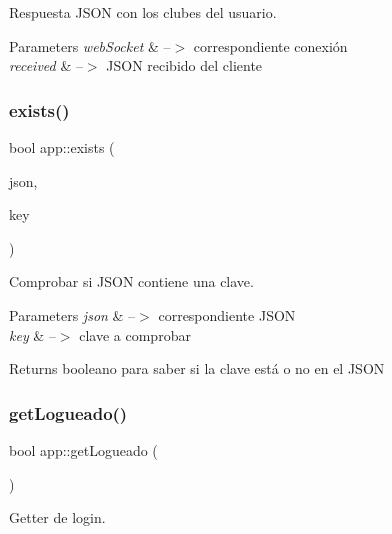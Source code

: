 Respuesta J\+S\+ON con los clubes del usuario. 


\begin{DoxyParams}{Parameters}
{\em web\+Socket} & --$>$ correspondiente conexión \\
\hline
{\em received} & --$>$ J\+S\+ON recibido del cliente \\
\hline
\end{DoxyParams}
\mbox{\label{classapp_a42e2a44d3325daf63b3ec57b8921d1b5}} 
\subsubsection{\texorpdfstring{exists()}{exists()}}
{\footnotesize\ttfamily bool app\+::exists (\begin{DoxyParamCaption}\item[{const \mbox{\hyperlink{classnlohmann_1_1basic__json}{J\+S\+ON}} \&}]{json,  }\item[{const std\+::string \&}]{key }\end{DoxyParamCaption})}



Comprobar si J\+S\+ON contiene una clave. 


\begin{DoxyParams}{Parameters}
{\em json} & --$>$ correspondiente J\+S\+ON \\
\hline
{\em key} & --$>$ clave a comprobar \\
\hline
\end{DoxyParams}
\begin{DoxyReturn}{Returns}
booleano para saber si la clave está o no en el J\+S\+ON 
\end{DoxyReturn}
\mbox{\label{classapp_a9d5d32bf19b4ae0a9c9d7fab8d87ac0f}} 
\subsubsection{\texorpdfstring{get\+Logueado()}{getLogueado()}}
{\footnotesize\ttfamily bool app\+::get\+Logueado (\begin{DoxyParamCaption}{ }\end{DoxyParamCaption})}



Getter de login. 


